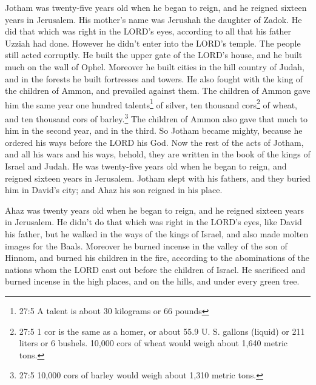 \mychapter{} \myverse*{}Jotham was twenty-five years old when he began to reign, and he
reigned sixteen years in Jerusalem. His mother’s name was Jerushah the daughter of Zadok.
\myverse{}He did that which was right in the LORD’s eyes, according to all that his father
Uzziah had done. However he didn’t enter into the LORD’s temple. The people still acted corruptly.
\myverse{}He built the upper gate of the LORD’s house, and he built much on the wall
of Ophel.
\myverse{}Moreover he built cities in the hill country of Judah, and in the forests he
built fortresses and towers.
\myverse{}He also fought with the king of the children of Ammon, and prevailed against
them. The children of Ammon gave him the same year one hundred talents\footnote{27:5 A talent is about 30 kilograms or 66 pounds} of silver, ten thousand cors\footnote{27:5 1 cor is the same as a homer, or about 55.9 U. S. gallons (liquid) or 211 liters or 6 bushels.
	10,000 cors of wheat would weigh about 1,640 metric tons.} of wheat, and ten thousand cors of
barley.\footnote{27:5 10,000 cors of barley would weigh about 1,310 metric tons.} The children of Ammon also
gave that much to him in the second year, and in the third.
\myverse{}So Jotham became mighty, because he ordered his ways before the LORD his God.
\myverse{}Now the rest of the acts of Jotham, and all his wars and his ways, behold,
they are written in the book of the kings of Israel and Judah.
\myverse{}He was twenty-five years old when he began to reign, and reigned sixteen years
in Jerusalem.
\myverse{}Jotham slept with his fathers, and they buried him in David’s city; and Ahaz
his son reigned in his place.


\mychapter{} \myverse*{}Ahaz was twenty years old when he began to reign, and he reigned
sixteen years in Jerusalem. He didn’t do that which was right in the LORD’s eyes, like David his father,
\myverse{}but he walked in the ways of the kings of Israel, and also made molten images
for the Baals.
\myverse{}Moreover he burned incense in the valley of the son of Hinnom, and burned his
children in the fire, according to the abominations of the nations whom the LORD cast out before the children
of Israel.
\myverse{}He sacrificed and burned incense in the high places, and on the hills, and
under every green tree.

